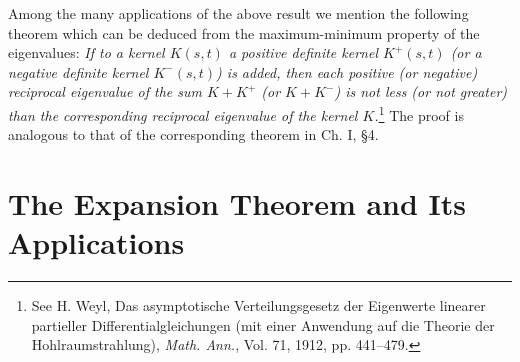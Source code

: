 Among the many applications of the above result we mention the following theorem which can be deduced from the maximum-minimum property of the eigenvalues: \emph{If to a kernel $K(s,t)$ a positive definite kernel $K^+(s,t)$ (or a negative definite kernel $K^-(s,t)$) is added, then each positive (or negative) reciprocal eigenvalue of the sum $K+K^+$ (or $K+K^-$) is not less (or not greater) than the corresponding reciprocal eigenvalue of the kernel $K$.}\footnote{See H. Weyl, Das asymptotische Verteilungsgesetz der Eigenwerte linearer partieller Differentialgleichungen (mit einer Anwendung auf die Theorie der Hohlraumstrahlung), \emph{Math. Ann.}, Vol. 71, 1912, pp. 441--479.} The proof is analogous to that of the corresponding theorem in Ch. I, \S4.

\section{The Expansion Theorem and Its Applications}

